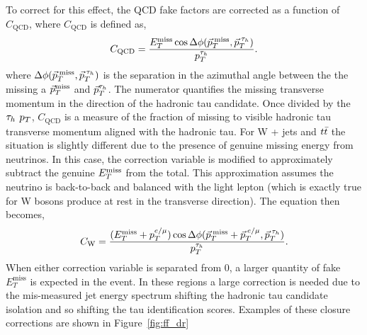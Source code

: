 To correct for this effect, the QCD fake factors are corrected as a function of $C_{\text{QCD}}$, where $C_{\text{QCD}}$ is defined as,
\begin{equation}
C_{\text{QCD}} = \frac{E_{T}^{\text{miss}} \cos\Delta\phi(\vec{p}_{T}^{\text{\hspace{2pt}miss}},\vec{p}_{T}^{\hspace{2pt}\tau_{h}})}{p_{T}^{\tau_{h}}}.
\label{eqn:c_qcd}
\end{equation}
where $\Delta\phi(\vec{p}_{T}^{\hspace{2pt}\text{miss}},\vec{p}_{T}^{\hspace{2pt}\tau_{h}})$ is the separation in the azimuthal angle between the the missing a $\vec{p}_{T}^{\text{miss}}$ and $\vec{p}_{T}^{\tau_{h}}$.
The numerator quantifies the missing transverse momentum in the direction of the hadronic tau candidate. 
Once divided by the $\tau_{h}$ $p_{T}$, $C_{\text{QCD}}$ is a measure of the fraction of missing to visible hadronic tau transverse momentum aligned with the hadronic tau.
For W + jets and $t\bar{t}$ the situation is slightly different due to the presence of genuine missing energy from neutrinos.
In this case, the correction variable is modified to approximately subtract the genuine $E_{T}^{\text{miss}}$ from the total.
This approximation assumes the neutrino is back-to-back and balanced with the light lepton (which is exactly true for W bosons produce at rest in the transverse direction). 
The equation then becomes,
\begin{equation}
C_{\text{W}} = \frac{(E_{T}^{\text{miss}}+p_{T}^{e/\mu}) \cos\Delta\phi(\vec{p}_{T}^{\text{\hspace{2pt}miss}}+\vec{p}_{T}^{\hspace{2pt}e/\mu},\vec{p}_{T}^{\hspace{2pt}\tau_{h}})}{p_{T}^{\tau_{h}}}.
\label{eqn:c_w}
\end{equation}
When either correction variable is separated from 0, a larger quantity of fake $E_{T}^{\text{miss}}$ is expected in the event. 
In these regions a large correction is needed due to the mis-measured jet energy spectrum shifting the hadronic tau candidate isolation and so shifting the tau identification scores. 
Examples of these closure corrections are shown in Figure~\ref{fig:ff_dr}\\

